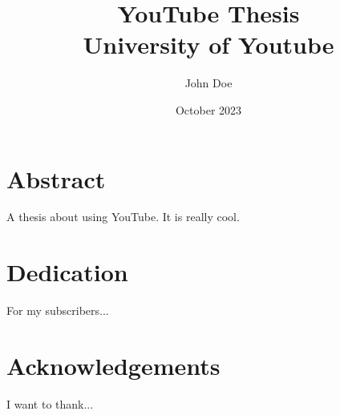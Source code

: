 \documentclass[twoside]{report}
\title{YouTube Thesis\\
{\Large University of Youtube}
}
\author{John Doe}
\date{October 2023}
\begin{document}
\maketitle

\chapter*{Abstract}
A thesis about using YouTube. It is really cool.

\chapter*{Dedication}
For my subscribers... 

\chapter*{Acknowledgements}
I want to thank...

\tableofcontents
\listoffigures





\appendix




\end{document}
